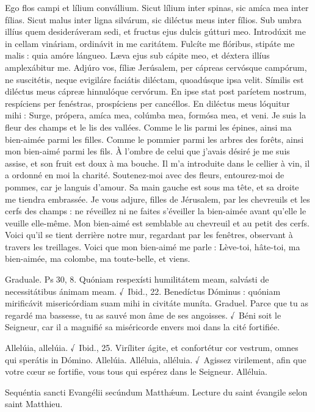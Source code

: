 \begin{paracol}{2}
Ego flos campi et lílium convállium.  Sicut lílium inter spinas, sic amíca mea inter fílias. Sicut malus inter ligna silvárum, sic diléctus meus inter fílios. Sub umbra illíus quem desideráveram sedi, et fructus ejus dulcis gútturi meo. Introdúxit me in cellam vináriam, ordinávit in me caritátem. Fulcíte me flóribus, stipáte me malis : quia amóre lángueo. Læva ejus sub cápite meo, et déxtera illíus amplexábitur me. Adjúro vos, fíliæ Jerúsalem, per cápreas cervósque campórum, ne suscitétis, neque evigiláre faciátis diléctam, quoadúsque ipsa velit. Símilis est diléctus meus cápreæ hinnulóque cervórum. En ipse stat post paríetem nostrum, respíciens per fenéstras, prospíciens per cancéllos. En diléctus meus lóquitur mihi : Surge, própera, amíca mea, colúmba mea, formósa mea, et veni.
\switchcolumn
Je suis la fleur des champs et le lis des  vallées. Comme le lis parmi les épines, ainsi ma bien-aimée parmi les filles. Comme le pommier parmi les arbres des forêts, ainsi mon bien-aimé parmi les fils. À l’ombre de celui que j’avais désiré je me suis assise, et son fruit est doux à ma bouche. Il m’a introduite dans le cellier à vin, il a ordonné en moi la charité. Soutenez-moi avec des fleurs, entourez-moi de pommes, car je languis d’amour. Sa main gauche est sous ma tête, et sa droite me tiendra embrassée. Je vous adjure, filles de Jérusalem, par les chevreuils et les cerfs des champs : ne réveillez ni ne faites s’éveiller la bien-aimée avant qu’elle le veuille elle-même. Mon bien-aimé est semblable au chevreuil et au petit des cerfs. Voici qu’il se tient derrière notre mur, regardant par les fenêtres, observant à travers les treillages. Voici que mon bien-aimé me parle : Lève-toi, hâte-toi, ma bien-aimée, ma colombe, ma toute-belle, et viens.
\switchcolumn*

Graduale. Ps 30, 8. Quóniam respexísti humilitátem meam, salvásti de necessitátibus ánimam meam. √~Ibid., 22. Benedíctus Dóminus : quóniam mirificávit misericórdiam suam mihi in civitáte muníta.
\switchcolumn
Graduel. Parce que tu as regardé ma bassesse, tu as sauvé mon âme de ses angoisses. √~Béni soit le Seigneur, car il a magnifié sa miséricorde envers moi dans la cité fortifiée.
\switchcolumn*

Allelúia, allelúia. √~Ibid., 25. Viríliter ágite, et confortétur cor vestrum, omnes qui sperátis in Dómino. Allelúia.
\switchcolumn
Alléluia, alléluia. √~Agissez virilement, afin que votre cœur se fortifie, vous tous qui espérez dans le Seigneur. Alléluia.
\switchcolumn*

Sequéntia sancti Evangélii secúndum Matthǽum.
\switchcolumn
Lecture du saint évangile selon saint Matthieu.
\switchcolumn*


\end{paracol}
